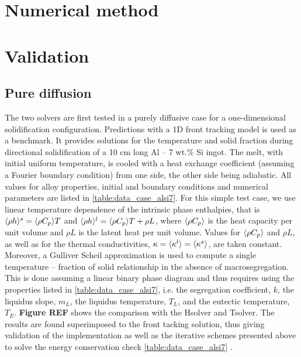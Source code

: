 \section{Numerical method}
%

%
\section{Validation}
%
\subsection{Pure diffusion}
The two solvers are first tested in a purely diffusive case for a one-dimensional solidification configuration. 
Predictions with a 1D front tracking model \citep{gandin_constrained_2000} is used as a benchmark. It provides 
solutions for the temperature and solid fraction during directional solidification of a 10 cm long Al – 7 wt.\% Si 
ingot. The melt, with initial uniform temperature, is cooled with a heat exchange coefficient (assuming a Fourier 
boundary condition) from one side, the other side being adiabatic. All values for alloy properties, initial and 
boundary conditions and numerical parameters are listed in \autoref{table:data_case_alsi7}. For this simple test case, 
we use linear temperature dependence of the intrinsic phase enthalpies, that is $\langle  \rho h  \rangle^s= \langle  \rho C_p  \rangle T$ and $\langle  \rho h  \rangle^l= \langle  \rho C_p  \rangle T + \rho L$, 
where $\langle  \rho C_p  \rangle$ is the heat capacity per unit volume and $\rho L$ is the latent heat per unit volume. Values for $\langle  \rho C_p  \rangle$ 
and $\rho L$, as well as for the thermal conductivities, $\kappa = \langle \kappa^l \rangle = \langle \kappa^s \rangle$, are taken constant. Moreover, a 
Gulliver Scheil approximation is used to compute a single temperature – fraction of solid relationship in the 
absence of macrosegregation. This is done assuming a linear binary phase diagram and thus requires using the 
properties listed in \autoref{table:data_case_alsi7}, i.e. the segregation coefficient, $k$, the liquidus slope, $m_L$, the 
liquidus temperature, $T_L$, and the eutectic temperature, $T_E$. \textbf{Figure REF} shows the comparison with 
the Hsolver and Tsolver. The results are found superimposed to the front tacking solution, thus giving validation 
of the implementation as well as the iterative schemes presented above to solve the energy conservation check \cref{table:data_case_alsi7}	
.

